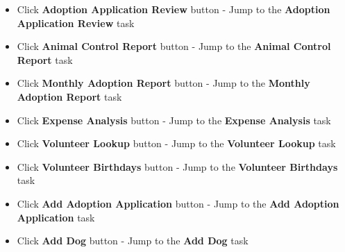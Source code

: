 \documentclass{article}
\begin{document}
\begin{itemize}
\begin{itemize}
        \item Click \textbf{Adoption Application Review} button - Jump to the \textbf{Adoption Application Review} task
        \item Click \textbf{Animal Control Report} button - Jump to the \textbf{Animal Control Report} task
        \item Click \textbf{Monthly Adoption Report} button - Jump to the \textbf{Monthly Adoption Report} task
        \item Click \textbf{Expense Analysis} button - Jump to the \textbf{Expense Analysis} task
        \item Click \textbf{Volunteer Lookup} button - Jump to the \textbf{Volunteer Lookup} task
        \item Click \textbf{Volunteer Birthdays} button - Jump to the \textbf{Volunteer Birthdays} task
        \item Click \textbf{Add Adoption Application} button - Jump to the \textbf{Add Adoption Application} task
        \item Click \textbf{Add Dog} button - Jump to the \textbf{Add Dog} task
    \end{itemize}
\end{itemize}
\end{document}
